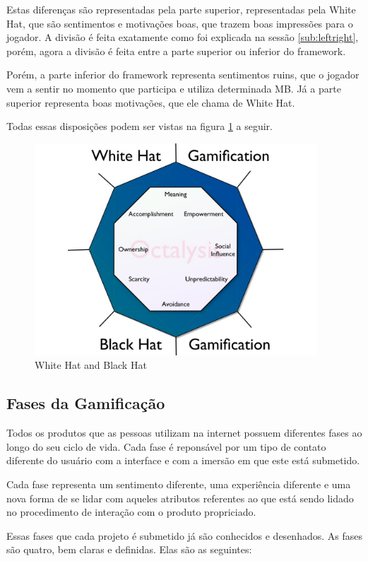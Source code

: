 Estas diferenças são representadas pela parte superior, representadas
pela White Hat, que são sentimentos e motivações boas, que trazem
boas impressões para o jogador. A divisão é feita exatamente como
foi explicada na sessão \ref{sub:leftright}, porém, agora a
divisão é feita entre a parte superior ou inferior do framework.

Porém, a parte inferior do framework representa sentimentos ruins, que o jogador
vem a sentir no momento que participa e utiliza determinada MB. Já a
parte superior representa boas motivações, que ele chama de White Hat.

Todas essas disposições podem ser vistas na figura
\ref{fig:octalysiswhiteblack} a seguir.

\begin{figure}[h]
    \centering
    \includegraphics[width=400px, scale=1]{figuras/octalysiswhiteblack}
    \caption{White Hat and Black Hat}
    \label{fig:octalysiswhiteblack}
\end{figure}

\subsection{Fases da Gamificação}
\label{sub:fasesgamifição}
Todos os produtos que as pessoas utilizam na internet possuem diferentes
fases ao longo do seu ciclo de vida. Cada fase é reponsável por um tipo de contato diferente
do usuário com a interface e com a imersão em que este está submetido.

Cada fase representa um sentimento diferente, uma experiência diferente
e uma nova forma de se lidar com aqueles atributos referentes ao que está
sendo lidado no procedimento de interação com o produto propriciado.

Essas fases que cada projeto é submetido já são conhecidos e desenhados. As fases
são quatro, bem claras e definidas. Elas são as seguintes:

